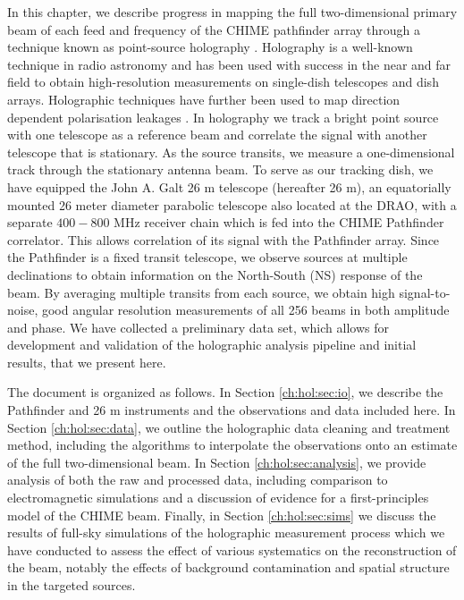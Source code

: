 In this chapter, we describe progress in mapping the full two-dimensional primary beam of each feed and frequency of the CHIME pathfinder array through a technique known as point-source holography \citep{radio1, radio2}. Holography is a well-known technique in radio astronomy and has been used with success in the near \citep{hol1} and far field \citep{hol2} to obtain high-resolution measurements on single-dish telescopes and dish arrays. Holographic techniques have further been used to map direction dependent polarisation leakages \citep{holpol}. In holography we track a bright point source with one telescope as a reference beam and correlate the signal with another telescope that is stationary. As the source transits, we measure a one-dimensional track through the stationary antenna beam. To serve as our tracking dish, we have equipped the John A. Galt 26 m telescope\citep{wolleben1, wolleben2} (hereafter 26 m), an equatorially mounted 26 meter diameter parabolic telescope also located at the DRAO, with a separate $400-800$ MHz receiver chain which is fed into the CHIME Pathfinder correlator. This allows correlation of its signal with the Pathfinder array. Since the Pathfinder is a fixed transit telescope, we observe sources at multiple declinations to obtain information on the North-South (NS) response of the beam. By averaging multiple transits from each source, we obtain high signal-to-noise, good angular resolution measurements of all 256 beams in both amplitude and phase. We have collected a preliminary data set, which allows for development and validation of the holographic analysis pipeline and initial results, that we present here.

The document is organized as follows. In Section \ref{ch:hol:sec:io}, we describe the Pathfinder and 26 m instruments and the observations and data included here. In Section \ref{ch:hol:sec:data}, we outline the holographic data cleaning and treatment method, including the algorithms to interpolate the observations onto an estimate of the full two-dimensional beam. In Section \ref{ch:hol:sec:analysis}, we provide analysis of both the raw and processed data, including comparison to electromagnetic simulations and a discussion of evidence for a first-principles model of the CHIME beam. Finally, in Section \ref{ch:hol:sec:sims} we discuss the results of full-sky simulations of the holographic measurement process which we have conducted to assess the effect of various systematics on the reconstruction of the beam, notably the effects of background contamination and spatial structure in the targeted sources.


